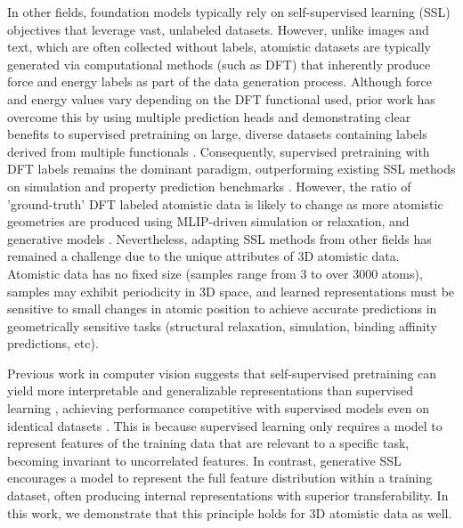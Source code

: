 In other fields, foundation models typically rely on self-supervised learning (SSL) objectives that leverage vast, unlabeled datasets. However, unlike images and text, which are often collected without labels, atomistic datasets are typically generated via computational methods (such as DFT) that inherently produce force and energy labels as part of the data generation process. Although force and energy values vary depending on the DFT functional used, prior work has overcome this by using multiple prediction heads and demonstrating clear benefits to supervised pretraining on large, diverse datasets containing labels derived from multiple functionals \cite{UMA_wood2025, JMP_Shoghi2023}. Consequently, supervised pretraining with DFT labels remains the dominant paradigm, outperforming existing SSL methods on simulation and property prediction benchmarks \cite{JMP_Shoghi2023, NoisyNodes_Zaidi2023PVD}. However, the ratio of 'ground-truth' DFT labeled atomistic data is likely to change as more atomistic geometries are produced using MLIP-driven simulation or relaxation, and generative models \cite{boltz1_2024, boltz2_2025, Sair_dataset, UMA_wood2025, mattergen_zeni2023, MACE_batatia2025, GeomRep_li2024}. Nevertheless, adapting SSL methods from other fields has remained a challenge due to the unique attributes of 3D atomistic data. Atomistic data has no fixed size (samples range from 3 to over 3000 atoms), samples may exhibit periodicity in 3D space, and learned representations must be sensitive to small changes in atomic position to achieve accurate predictions in geometrically sensitive tasks (structural relaxation, simulation, binding affinity predictions, etc). 

Previous work in computer vision suggests that self-supervised pretraining can yield more interpretable and generalizable representations than supervised learning \cite{Mocov3_chen2021, Dino2_oquab2024, DINO3_siméoni2025dinov3}, achieving performance competitive with supervised models even on identical datasets \cite{MAE_he2021, ReLicv2_tomasev2022}. This is because supervised learning only requires a model to represent features of the training data that are relevant to a specific task, becoming invariant to uncorrelated features. In contrast, generative SSL encourages a model to represent the full feature distribution within a training dataset, often producing internal representations with superior transferability. In this work, we demonstrate that this principle holds for 3D atomistic data as well.



